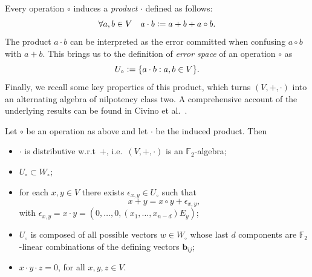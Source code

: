 \documentclass[runningheads,a4paper,english]{llncs}
\newcommand{\F}{\mathbb{F}}
\newcommand{\eps}{\epsilon}
\newcommand{\defeq}{\vcentcolon=}
\newcommand{\ind}[1]{\mathds{1}_{#1}}
\renewcommand{\b}{\textbf{b}}
\newcommand{\wo}{W_\circ}
\newcommand{\Uo}{U_\circ}
\newcommand{\uo}{U_\circ}
\newcommand{\subs}{\subset}
\newcommand{\mathhex}[1]{\texttt{#1}_\text{x}} %
\begin{document}
Every operation $\circ$ induces a \emph{product} $\cdot$ defined as follows:
\[
\forall a, b \in V \quad a\cdot b \defeq a + b + a \circ b.
\]
The product $a \cdot b$ can be interpreted as the error committed when confusing $a \circ b$ with $a + b$. This brings us to the definition of \emph{error space} of an operation $\circ$ as
\[
    \Uo \defeq \{a \cdot b :  a, b \in V\}.
\]
Finally, we recall some key properties of this product, which turns $(V,+,\cdot)$ into an alternating algebra of nilpotency class two. A comprehensive account of the underlying results can be found in Civino et al.~\cite{civino2019differential}.
\begin{proposition}
	\label{prop:info_prod}
    Let $\circ$ be an operation as above and let $\cdot$ be the induced product. Then
    \begin{itemize}
        \item $\cdot$ is distributive w.r.t\ $+$, i.e.\ $(V, +, \cdot)$ is an $\F_2$-algebra;
        \item $\Uo \subs \wo$;
        \item for each $x,y \in V$ there exists $\eps_{x,y} \in \uo$ such that
        \[
        x + y = x \circ y + \eps_{x, y},
        \]
        with $\eps_{x, y} = x \cdot y = (0, \dots, 0, (x_1,\dots, x_{n-d})E_y)$;
        \item $\uo$ is composed of all possible vectors $w \in \wo$ whose last $d$ components are $\F_2$-linear combinations of the defining vectors $\b_{ij}$;
        \item $x \cdot y \cdot z = 0$, for all $x, y, z \in V$.
    \end{itemize}
\end{proposition}
\end{document}
